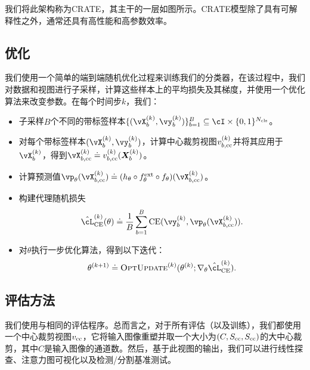 \documentclass[../../book-main.tex]{subfiles}
\begin{document}
我们将此架构称为CRATE，其主干的一层如图所示。CRATE模型除了具有可解释性之外，通常还具有高性能和高参数效率。

\subsection{优化} \label{sub:image_classification_optimization}

我们使用一个简单的端到端随机优化过程来训练我们的分类器，在该过程中，我们对数据和视图进行子采样，计算这些样本上的平均损失及其梯度，并使用一个优化算法来改变参数。在每个时间步\(k\)，我们：
\begin{itemize}
    \item 子采样\(B\)个不同的带标签样本\(\{(\vX_{b}^{(k)}, \vy_{b}^{(k)})\}_{b = 1}^{B} \subseteq \cI \times \{0, 1\}^{N_{\cls}}\)。
    \item 对每个带标签样本\((\vX_{b}^{(k)}, \vy_{b}^{(k)})\)，计算中心裁剪视图\(v_{b, \mathrm{cc}}^{(k)}\)并将其应用于\(\vX_{b}^{(k)}\)，得到\(\vX_{b, \cc}^{(k)} \doteq v_{b, \cc}^{(k)}(\X_{b}^{(k)})\)。
    \item 计算预测值\(\vp_{\theta}(\vX_{b, \cc}^{(k)}) \doteq (h_{\theta} \circ f_{\theta}^{\ext} \circ f_{\theta})(\vX_{b, \cc}^{(k)})\)。
    \item 构建代理随机损失
    \begin{equation}
        \hat{\cL}_{\CE}^{(k)}(\theta) \doteq \frac{1}{B}\sum_{b = 1}^{B}\CE(\vy_{b}^{(k)}, \vp_{\theta}(\vX_{b, \cc}^{(k)})).
    \end{equation}
    \item 对\(\theta\)执行一步优化算法，得到以下迭代：
    \begin{equation}
        \theta^{(k + 1)} \doteq \textsc{OptUpdate}^{(k)}(\theta^{(k)}; \nabla_{\theta}\hat{\cL}_{\CE}^{(k)}).
    \end{equation}
\end{itemize}


\subsection{评估方法} \label{sub:image_classification_evals}

我们使用与相同的评估程序。总而言之，对于所有评估（以及训练），我们都使用一个中心裁剪视图\(v_{\mathrm{cc}}\)，它将输入图像重塑并取一个大小为\((C, S_{\mathrm{cc}}, S_{\mathrm{cc}})\)的大中心裁剪，其中\(C\)是输入图像的通道数。然后，基于此视图的输出，我们可以进行线性探查、注意力图可视化以及检测/分割基准测试。
\end{document}
